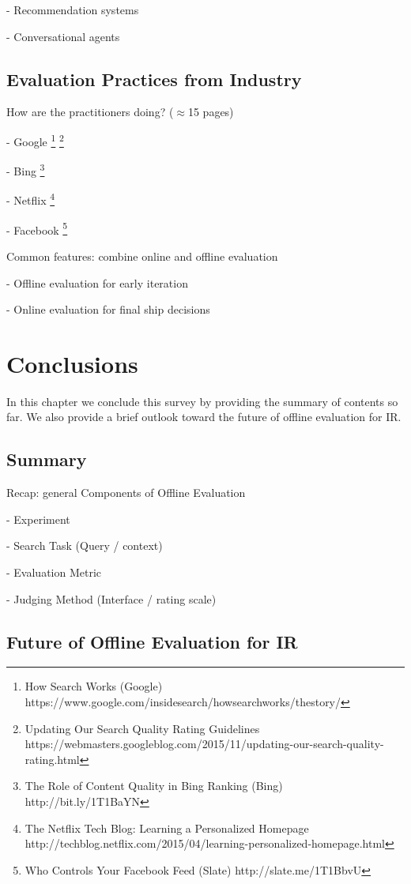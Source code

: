 \documentclass[openany]{now} %
\newcommand{\newpar}{\bigskip\noindent}
\begin{document}
- Recommendation systems \cite{gunawardana2015evaluating}

- Conversational agents

\section{Evaluation Practices from Industry}

How are the practitioners doing? (\ensuremath{\approx}15 pages)

-	Google \footnote{How Search Works (Google) https://www.google.com/insidesearch/howsearchworks/thestory/} \footnote{Updating Our Search Quality Rating Guidelines
	 https://webmasters.googleblog.com/2015/11/updating-our-search-quality-rating.html}

-	Bing \footnote{The Role of Content Quality in Bing Ranking (Bing)
	 http://bit.ly/1T1BaYN}

-	Netflix \cite{Gomez-Uribe2015}  \footnote{The Netflix Tech Blog: Learning a Personalized Homepage
	http://techblog.netflix.com/2015/04/learning-personalized-homepage.html}

-	Facebook \footnote{Who Controls Your Facebook Feed (Slate) http://slate.me/1T1BbvU}

\newpar
Common features: combine online and offline evaluation

- Offline evaluation for early iteration

- Online evaluation for final ship decisions

\chapter{Conclusions}

In this chapter we conclude this survey by providing the summary of contents so far. 
We also provide a brief outlook toward the future of offline evaluation for IR.

\section{Summary}

Recap: general Components of Offline Evaluation

-	Experiment

-	Search Task (Query / context)

-	Evaluation Metric

-	Judging Method (Interface / rating scale) 


\section{Future of Offline Evaluation for IR}
\end{document}
